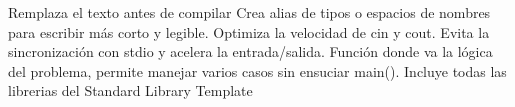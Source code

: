 \markdownRendererDocumentBegin
\markdownRendererSectionBegin
\markdownRendererSectionBegin
{}\markdownRendererInterblockSeparator
{}\markdownRendererSectionBegin
{}\markdownRendererInterblockSeparator
{}Remplaza el texto antes de compilar\markdownRendererInterblockSeparator
{}\markdownRendererInterblockSeparator
{}
\markdownRendererSectionEnd \markdownRendererSectionBegin
{}\markdownRendererInterblockSeparator
{}Crea alias de tipos o espacios de nombres para escribir más corto y legible.\markdownRendererInterblockSeparator
{}\markdownRendererInterblockSeparator
{}
\markdownRendererSectionEnd \markdownRendererSectionBegin
{}\markdownRendererInterblockSeparator
{}Optimiza la velocidad de cin y cout. Evita la sincronización con stdio y acelera la entrada/salida.\markdownRendererInterblockSeparator
{}\markdownRendererInterblockSeparator
{}
\markdownRendererSectionEnd \markdownRendererSectionBegin
{}\markdownRendererInterblockSeparator
{}Función donde va la lógica del problema, permite manejar varios casos sin ensuciar main().\markdownRendererParagraphSeparator
{}\markdownRendererInterblockSeparator
{}
\markdownRendererSectionEnd \markdownRendererSectionBegin
{}\markdownRendererInterblockSeparator
{}Incluye todas las librerias del Standard Library Template\markdownRendererInterblockSeparator
{}
\markdownRendererSectionEnd 
\markdownRendererSectionEnd 
\markdownRendererSectionEnd \markdownRendererDocumentEnd